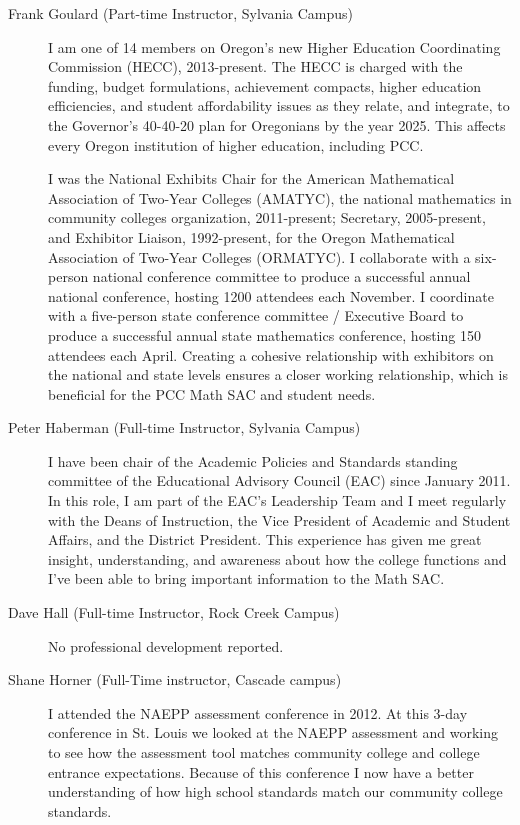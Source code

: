 \begin{description}
	\item[Frank Goulard (Part-time Instructor, Sylvania Campus)]
	I am one of 14 members on Oregon's new Higher Education Coordinating
	Commission (HECC), 2013-present.  The HECC is charged with the funding, budget
	formulations, achievement compacts, higher education efficiencies, and student
	affordability issues as they relate, and integrate, to the Governor's
	40-40-20 plan for Oregonians by the year 2025. This affects every Oregon
	institution of higher education, including PCC.

	I was the National Exhibits Chair for the American Mathematical Association of
	Two-Year Colleges (AMATYC), the national mathematics in community colleges
	organization, 2011-present; Secretary, 2005-present, and Exhibitor Liaison,
	1992-present, for the Oregon Mathematical Association of Two-Year Colleges
	(ORMATYC). I collaborate with a six-person national conference committee to
	produce a successful annual national conference, hosting 1200 attendees each
	November. I coordinate with a five-person state conference committee /
	Executive Board to produce a successful annual state mathematics conference,
	hosting 150 attendees each April. Creating a cohesive relationship with
	exhibitors on the national and state levels ensures a closer working
	relationship, which is beneficial for the PCC Math SAC and student needs.

	\item[Peter Haberman (Full-time Instructor, Sylvania Campus)]
	I have been chair of the Academic Policies and Standards standing committee of
	the Educational Advisory Council (EAC) since January 2011.  In this role, I am
	part of the EAC's Leadership Team and I meet regularly with the Deans of
	Instruction, the Vice President of Academic and Student Affairs, and the
	District President.  This experience has given me great insight, understanding,
	and awareness about how the college functions and I've been able to bring
	important information to the Math SAC.

	\item[Dave Hall (Full-time Instructor, Rock Creek Campus)]
	No professional development reported.
	\item[Shane Horner (Full-Time instructor, Cascade campus)]
	I attended the NAEPP assessment conference in 2012.  At this 3-day conference
	in St. Louis we looked at the NAEPP assessment and working to see how the
	assessment tool matches community college and college entrance expectations.
	Because of this conference I now have a better understanding of how high school
	standards match our community college standards.


\end{description}
